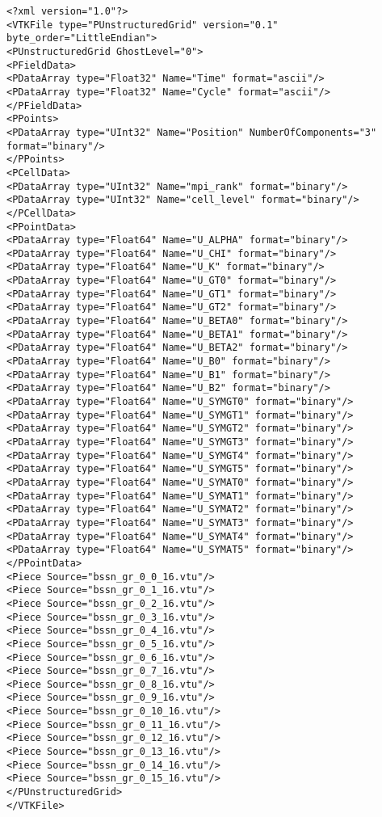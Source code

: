 \begin{lstlisting}[basicstyle=\small]
<?xml version="1.0"?>
<VTKFile type="PUnstructuredGrid" version="0.1" byte_order="LittleEndian">
<PUnstructuredGrid GhostLevel="0">
<PFieldData>
<PDataArray type="Float32" Name="Time" format="ascii"/>
<PDataArray type="Float32" Name="Cycle" format="ascii"/>
</PFieldData>
<PPoints>
<PDataArray type="UInt32" Name="Position" NumberOfComponents="3" format="binary"/>
</PPoints>
<PCellData>
<PDataArray type="UInt32" Name="mpi_rank" format="binary"/>
<PDataArray type="UInt32" Name="cell_level" format="binary"/>
</PCellData>
<PPointData>
<PDataArray type="Float64" Name="U_ALPHA" format="binary"/>
<PDataArray type="Float64" Name="U_CHI" format="binary"/>
<PDataArray type="Float64" Name="U_K" format="binary"/>
<PDataArray type="Float64" Name="U_GT0" format="binary"/>
<PDataArray type="Float64" Name="U_GT1" format="binary"/>
<PDataArray type="Float64" Name="U_GT2" format="binary"/>
<PDataArray type="Float64" Name="U_BETA0" format="binary"/>
<PDataArray type="Float64" Name="U_BETA1" format="binary"/>
<PDataArray type="Float64" Name="U_BETA2" format="binary"/>
<PDataArray type="Float64" Name="U_B0" format="binary"/>
<PDataArray type="Float64" Name="U_B1" format="binary"/>
<PDataArray type="Float64" Name="U_B2" format="binary"/>
<PDataArray type="Float64" Name="U_SYMGT0" format="binary"/>
<PDataArray type="Float64" Name="U_SYMGT1" format="binary"/>
<PDataArray type="Float64" Name="U_SYMGT2" format="binary"/>
<PDataArray type="Float64" Name="U_SYMGT3" format="binary"/>
<PDataArray type="Float64" Name="U_SYMGT4" format="binary"/>
<PDataArray type="Float64" Name="U_SYMGT5" format="binary"/>
<PDataArray type="Float64" Name="U_SYMAT0" format="binary"/>
<PDataArray type="Float64" Name="U_SYMAT1" format="binary"/>
<PDataArray type="Float64" Name="U_SYMAT2" format="binary"/>
<PDataArray type="Float64" Name="U_SYMAT3" format="binary"/>
<PDataArray type="Float64" Name="U_SYMAT4" format="binary"/>
<PDataArray type="Float64" Name="U_SYMAT5" format="binary"/>
</PPointData>
<Piece Source="bssn_gr_0_0_16.vtu"/>
<Piece Source="bssn_gr_0_1_16.vtu"/>
<Piece Source="bssn_gr_0_2_16.vtu"/>
<Piece Source="bssn_gr_0_3_16.vtu"/>
<Piece Source="bssn_gr_0_4_16.vtu"/>
<Piece Source="bssn_gr_0_5_16.vtu"/>
<Piece Source="bssn_gr_0_6_16.vtu"/>
<Piece Source="bssn_gr_0_7_16.vtu"/>
<Piece Source="bssn_gr_0_8_16.vtu"/>
<Piece Source="bssn_gr_0_9_16.vtu"/>
<Piece Source="bssn_gr_0_10_16.vtu"/>
<Piece Source="bssn_gr_0_11_16.vtu"/>
<Piece Source="bssn_gr_0_12_16.vtu"/>
<Piece Source="bssn_gr_0_13_16.vtu"/>
<Piece Source="bssn_gr_0_14_16.vtu"/>
<Piece Source="bssn_gr_0_15_16.vtu"/>
</PUnstructuredGrid>
</VTKFile> 
\end{lstlisting}


